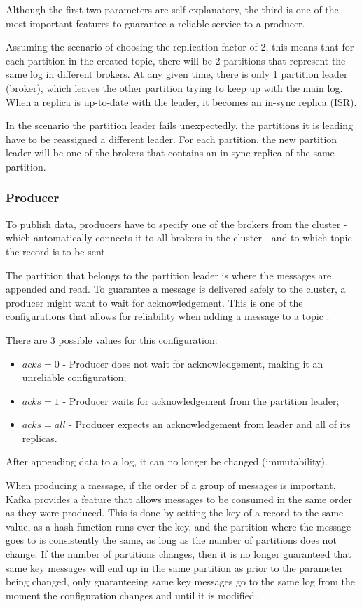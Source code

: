 Although the first two parameters are self-explanatory, the third is one of the most important features to guarantee a reliable service to a producer. 

Assuming the scenario of choosing the replication factor of 2, this means that for each partition in the created topic, there will be 2 partitions that represent the same log in different brokers. At any given time, there is only 1 partition leader (broker), which leaves the other partition trying to keep up with the main log. When a replica is up-to-date with the leader, it becomes an in-sync replica (ISR).


In the scenario the partition leader fails unexpectedly, the partitions it is leading have to be reassigned a different leader. For each partition, the new partition leader will be one of the brokers that contains an in-sync replica of the same partition.

\subsubsection{Producer}

To publish data, producers have to specify one of the brokers from the cluster - which automatically connects it to all brokers in the cluster - and to which topic the record is to be sent.

The partition that belongs to the partition leader is where the messages are appended and read. To guarantee a message is delivered safely to the cluster, a producer might want to wait for acknowledgement. This is one of the configurations that allows for reliability when adding a message to a topic \cite{KafkaProducer}. 

There are 3 possible values for this configuration:
\begin{itemize}
    \item $acks=0$ - Producer does not wait for acknowledgement, making it an unreliable configuration;
    \item $acks=1$ - Producer waits for acknowledgement from the partition leader;
    \item $acks=all$ - Producer expects an acknowledgement from leader and all of its replicas.
\end{itemize}

After appending data to a log, it can no longer be changed (immutability).

When producing a message, if the order of a group of messages is important, Kafka provides a feature that allows messages to be consumed in the same order as they were produced. This is done by setting the key of a record to the same value, as a hash function runs over the key, and the partition where the message goes to is consistently the same, as long as the number of partitions does not change. If the number of partitions changes, then it is no longer guaranteed that same key messages will end up in the same partition as prior to the parameter being changed, only guaranteeing same key messages go to the same log from the moment the configuration changes and until it is modified.


